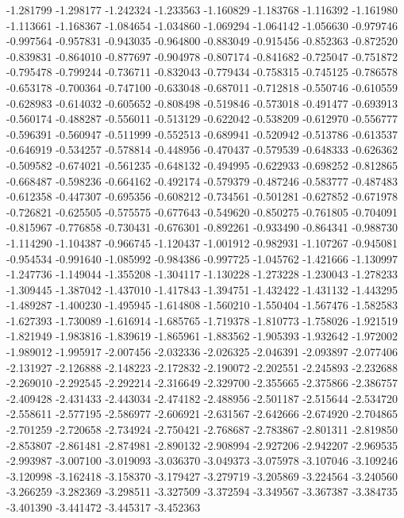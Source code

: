 -1.281799
-1.298177
-1.242324
-1.233563
-1.160829
-1.183768
-1.116392
-1.161980
-1.113661
-1.168367
-1.084654
-1.034860
-1.069294
-1.064142
-1.056630
-0.979746
-0.997564
-0.957831
-0.943035
-0.964800
-0.883049
-0.915456
-0.852363
-0.872520
-0.839831
-0.864010
-0.877697
-0.904978
-0.807174
-0.841682
-0.725047
-0.751872
-0.795478
-0.799244
-0.736711
-0.832043
-0.779434
-0.758315
-0.745125
-0.786578
-0.653178
-0.700364
-0.747100
-0.633048
-0.687011
-0.712818
-0.550746
-0.610559
-0.628983
-0.614032
-0.605652
-0.808498
-0.519846
-0.573018
-0.491477
-0.693913
-0.560174
-0.488287
-0.556011
-0.513129
-0.622042
-0.538209
-0.612970
-0.556777
-0.596391
-0.560947
-0.511999
-0.552513
-0.689941
-0.520942
-0.513786
-0.613537
-0.646919
-0.534257
-0.578814
-0.448956
-0.470437
-0.579539
-0.648333
-0.626362
-0.509582
-0.674021
-0.561235
-0.648132
-0.494995
-0.622933
-0.698252
-0.812865
-0.668487
-0.598236
-0.664162
-0.492174
-0.579379
-0.487246
-0.583777
-0.487483
-0.612358
-0.447307
-0.695356
-0.608212
-0.734561
-0.501281
-0.627852
-0.671978
-0.726821
-0.625505
-0.575575
-0.677643
-0.549620
-0.850275
-0.761805
-0.704091
-0.815967
-0.776858
-0.730431
-0.676301
-0.892261
-0.933490
-0.864341
-0.988730
-1.114290
-1.104387
-0.966745
-1.120437
-1.001912
-0.982931
-1.107267
-0.945081
-0.954534
-0.991640
-1.085992
-0.984386
-0.997725
-1.045762
-1.421666
-1.130997
-1.247736
-1.149044
-1.355208
-1.304117
-1.130228
-1.273228
-1.230043
-1.278233
-1.309445
-1.387042
-1.437010
-1.417843
-1.394751
-1.432422
-1.431132
-1.443295
-1.489287
-1.400230
-1.495945
-1.614808
-1.560210
-1.550404
-1.567476
-1.582583
-1.627393
-1.730089
-1.616914
-1.685765
-1.719378
-1.810773
-1.758026
-1.921519
-1.821949
-1.983816
-1.839619
-1.865961
-1.883562
-1.905393
-1.932642
-1.972002
-1.989012
-1.995917
-2.007456
-2.032336
-2.026325
-2.046391
-2.093897
-2.077406
-2.131927
-2.126888
-2.148223
-2.172832
-2.190072
-2.202551
-2.245893
-2.232688
-2.269010
-2.292545
-2.292214
-2.316649
-2.329700
-2.355665
-2.375866
-2.386757
-2.409428
-2.431433
-2.443034
-2.474182
-2.488956
-2.501187
-2.515644
-2.534720
-2.558611
-2.577195
-2.586977
-2.606921
-2.631567
-2.642666
-2.674920
-2.704865
-2.701259
-2.720658
-2.734924
-2.750421
-2.768687
-2.783867
-2.801311
-2.819850
-2.853807
-2.861481
-2.874981
-2.890132
-2.908994
-2.927206
-2.942207
-2.969535
-2.993987
-3.007100
-3.019093
-3.036370
-3.049373
-3.075978
-3.107046
-3.109246
-3.120998
-3.162418
-3.158370
-3.179427
-3.279719
-3.205869
-3.224564
-3.240560
-3.266259
-3.282369
-3.298511
-3.327509
-3.372594
-3.349567
-3.367387
-3.384735
-3.401390
-3.441472
-3.445317
-3.452363
